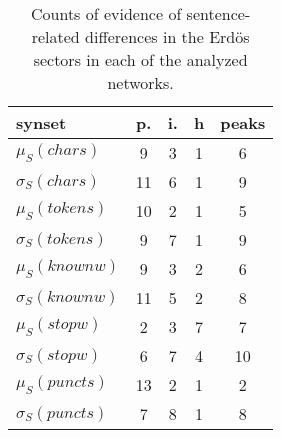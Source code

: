\begin{table}[h!]
\begin{center}
\begin{tabular}{| l | c | c | c | c |}\hline
synset & p. & i. & h & peaks \\\hline
$\mu_S(chars)$ & 9  & 3  & 1  & 6 \\\hline
$\sigma_S(chars)$ & 11  & 6  & 1  & 9 \\\hline
$\mu_S(tokens)$ & 10  & 2  & 1  & 5 \\\hline
$\sigma_S(tokens)$ & 9  & 7  & 1  & 9 \\\hline
$\mu_S(knownw)$ & 9  & 3  & 2  & 6 \\\hline
$\sigma_S(knownw)$ & 11  & 5  & 2  & 8 \\\hline
$\mu_S(stopw)$ & 2  & 3  & 7  & 7 \\\hline
$\sigma_S(stopw)$ & 6  & 7  & 4  & 10 \\\hline
$\mu_S(puncts)$ & 13  & 2  & 1  & 2 \\\hline
$\sigma_S(puncts)$ & 7  & 8  & 1  & 8 \\\hline
\end{tabular}
\caption{Counts of evidence of sentence-related differences in the Erd\"os sectors in each of the analyzed networks.}
\end{center}
\end{table}